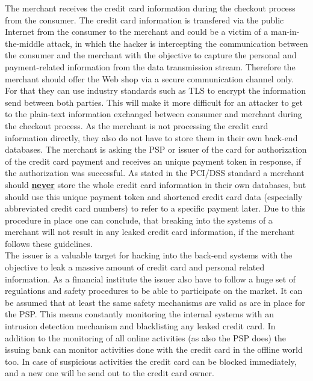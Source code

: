 The merchant receives the credit card information during the checkout process from the consumer. The credit card information is transfered via the public Internet from the consumer to the merchant and could be a victim of a man-in-the-middle attack, in which the hacker is intercepting the communication between the consumer and the merchant with the objective to capture the personal and payment-related information from the data transmission stream. Therefore the merchant should offer the Web shop via a secure communication channel only. For that they can use industry standards such as \gls{TLS} to encrypt the information send between both parties. This will make it more difficult for an attacker to get to the plain-text information exchanged between consumer and merchant during the checkout process. As the merchant is not processing the credit card information directly, they also do not have to store them in their own back-end databases. The merchant is asking the \gls{PSP} or issuer of the card for authorization of the credit card payment and receives an unique payment token in response, if the authorization was successful. As stated in the \gls{PCI/DSS} standard \citep{virtue2009payment} a merchant should \textbf{\underline{never}} store the whole credit card information in their own databases, but should use this unique payment token and shortened credit card data (especially abbreviated credit card numbers) to refer to a specific payment later. Due to this procedure in place one can conclude, that breaking into the systems of a merchant will not result in any leaked credit card information, if the merchant follows these guidelines. \\

The issuer is a valuable target for hacking into the back-end systems with the objective to leak a massive amount of credit card and personal related information. As a financial institute the issuer also have to follow a huge set of regulations and safety procedures to be able to participate on the market. It can be assumed that at least the same safety mechanisms are valid as are in place for the \gls{PSP}. This means constantly monitoring the internal systems with an intrusion detection mechanism and blacklisting any leaked credit card. In addition to the monitoring of all online activities (as also the \gls{PSP} does) the issuing bank can monitor activities done with the credit card in the offline world too. In case of suspicious activities the credit card can be blocked immediately, and a new one will be send out to the credit card owner. \\

